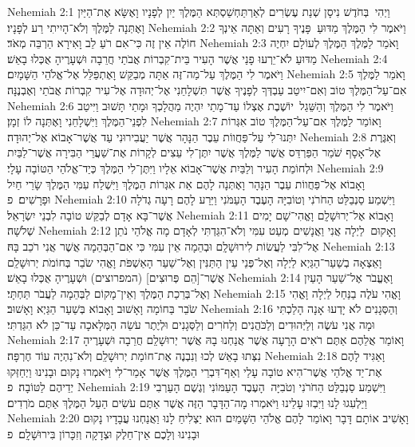 Nehemiah 2:1	וַיְהִי  בְּחֹדֶשׁ נִיסָן שְׁנַת עֶשְׂרִים לְאַרְתַּחְשַׁסְתְּא הַמֶּלֶךְ יַיִן לְפָנָיו וָאֶשָּׂא אֶת־הַיַּיִן וָאֶתְּנָה לַמֶּלֶךְ וְלֹא־הָיִיתִי רַע לְפָנָיו׃
Nehemiah 2:2	וַיֹּאמֶר לִי הַמֶּלֶךְ מַדּוּעַ  פָּנֶיךָ רָעִים וְאַתָּה אֵינְךָ חוֹלֶה אֵין זֶה כִּי־אִם רֹעַ לֵב וָאִירָא הַרְבֵּה מְאֹד׃
Nehemiah 2:3	וָאֹמַר לַמֶּלֶךְ הַמֶּלֶךְ לְעוֹלָם יִחְיֶה מַדּוּעַ לֹא־יֵרְעוּ פָנַי אֲשֶׁר הָעִיר בֵּית־קִבְרוֹת אֲבֹתַי חֲרֵבָה וּשְׁעָרֶיהָ אֻכְּלוּ בָאֵשׁ׃
Nehemiah 2:4	וַיֹּאמֶר לִי הַמֶּלֶךְ עַל־מַה־זֶּה אַתָּה מְבַקֵּשׁ וָאֶתְפַּלֵּל אֶל־אֱלֹהֵי הַשָּׁמָיִם׃
Nehemiah 2:5	וָאֹמַר לַמֶּלֶךְ אִם־עַל־הַמֶּלֶךְ טוֹב וְאִם־יִיטַב עַבְדְּךָ לְפָנֶיךָ אֲשֶׁר תִּשְׁלָחֵנִי אֶל־יְהוּדָה אֶל־עִיר קִבְרוֹת אֲבֹתַי וְאֶבְנֶנָּה׃
Nehemiah 2:6	וַיֹּאמֶר לִי הַמֶּלֶךְ וְהַשֵּׁגַל  יוֹשֶׁבֶת אֶצְלוֹ עַד־מָתַי יִהְיֶה מַהֲלָכְךָ וּמָתַי תָּשׁוּב וַיִּיטַב לִפְנֵי־הַמֶּלֶךְ וַיִּשְׁלָחֵנִי וָאֶתְּנָה לוֹ זְמָן׃
Nehemiah 2:7	וָאוֹמַר לַמֶּלֶךְ אִם־עַל־הַמֶּלֶךְ טוֹב אִגְּרוֹת יִתְּנוּ־לִי עַל־פַּחֲווֹת עֵבֶר הַנָּהָר אֲשֶׁר יַעֲבִירוּנִי עַד אֲשֶׁר־אָבוֹא אֶל־יְהוּדָה׃
Nehemiah 2:8	וְאִגֶּרֶת אֶל־אָסָף שֹׁמֵר הַפַּרְדֵּס אֲשֶׁר לַמֶּלֶךְ אֲשֶׁר יִתֶּן־לִי עֵצִים לְקָרוֹת אֶת־שַׁעֲרֵי הַבִּירָה אֲשֶׁר־לַבַּיִת וּלְחוֹמַת הָעִיר וְלַבַּיִת אֲשֶׁר־אָבוֹא אֵלָיו וַיִּתֶּן־לִי הַמֶּלֶךְ כְּיַד־אֱלֹהַי הַטּוֹבָה עָלָי׃
Nehemiah 2:9	וָאָבוֹא אֶל־פַּחֲווֹת עֵבֶר הַנָּהָר וָאֶתְּנָה לָהֶם אֵת אִגְּרוֹת הַמֶּלֶךְ וַיִּשְׁלַח עִמִּי הַמֶּלֶךְ שָׂרֵי חַיִל וּפָרָשִׁים׃ {פ}
Nehemiah 2:10	וַיִּשְׁמַע סַנְבַלַּט הַחֹרֹנִי וְטוֹבִיָּה הָעֶבֶד הָעַמֹּנִי וַיֵּרַע לָהֶם רָעָה גְדֹלָה אֲשֶׁר־בָּא אָדָם לְבַקֵּשׁ טוֹבָה לִבְנֵי יִשְׂרָאֵל׃
Nehemiah 2:11	וָאָבוֹא אֶל־יְרוּשָׁלָ͏ִם וָאֱהִי־שָׁם יָמִים שְׁלֹשָׁה׃
Nehemiah 2:12	וָאָקוּם  לַיְלָה אֲנִי וַאֲנָשִׁים  מְעַט עִמִּי וְלֹא־הִגַּדְתִּי לְאָדָם מָה אֱלֹהַי נֹתֵן אֶל־לִבִּי לַעֲשׂוֹת לִירוּשָׁלָ͏ִם וּבְהֵמָה אֵין עִמִּי כִּי אִם־הַבְּהֵמָה אֲשֶׁר אֲנִי רֹכֵב בָּהּ׃
Nehemiah 2:13	וָאֵצְאָה בְשַׁעַר־הַגַּיְא לַיְלָה וְאֶל־פְּנֵי עֵין הַתַּנִּין וְאֶל־שַׁעַר הָאַשְׁפֹּת וָאֱהִי שֹׂבֵר בְּחוֹמֹת יְרוּשָׁלַ͏ִם אֲשֶׁר־[הֵם  פְּרוּצִים] (המפרוצים) וּשְׁעָרֶיהָ אֻכְּלוּ בָאֵשׁ׃
Nehemiah 2:14	וָאֶעֱבֹר אֶל־שַׁעַר הָעַיִן וְאֶל־בְּרֵכַת הַמֶּלֶךְ וְאֵין־מָקוֹם לַבְּהֵמָה לַעֲבֹר תַּחְתָּי׃
Nehemiah 2:15	וָאֱהִי עֹלֶה בַנַּחַל לַיְלָה וָאֱהִי שֹׂבֵר בַּחוֹמָה וָאָשׁוּב וָאָבוֹא בְּשַׁעַר הַגַּיְא וָאָשׁוּב׃
Nehemiah 2:16	וְהַסְּגָנִים לֹא יָדְעוּ אָנָה הָלַכְתִּי וּמָה אֲנִי עֹשֶׂה וְלַיְּהוּדִים וְלַכֹּהֲנִים וְלַחֹרִים וְלַסְּגָנִים וּלְיֶתֶר עֹשֵׂה הַמְּלָאכָה עַד־כֵּן לֹא הִגַּדְתִּי׃
Nehemiah 2:17	וָאוֹמַר אֲלֵהֶם אַתֶּם רֹאִים הָרָעָה אֲשֶׁר אֲנַחְנוּ בָהּ אֲשֶׁר יְרוּשָׁלַ͏ִם חֲרֵבָה וּשְׁעָרֶיהָ נִצְּתוּ בָאֵשׁ לְכוּ וְנִבְנֶה אֶת־חוֹמַת יְרוּשָׁלַ͏ִם וְלֹא־נִהְיֶה עוֹד חֶרְפָּה׃
Nehemiah 2:18	וָאַגִּיד לָהֶם אֶת־יַד אֱלֹהַי אֲשֶׁר־הִיא טוֹבָה עָלַי וְאַף־דִּבְרֵי הַמֶּלֶךְ אֲשֶׁר אָמַר־לִי וַיֹּאמְרוּ נָקוּם וּבָנִינוּ וַיְחַזְּקוּ יְדֵיהֶם לַטּוֹבָה׃ {פ}
Nehemiah 2:19	וַיִּשְׁמַע סַנְבַלַּט הַחֹרֹנִי וְטֹבִיָּה  הָעֶבֶד הָעַמּוֹנִי וְגֶשֶׁם הָעַרְבִי וַיַּלְעִגוּ לָנוּ וַיִּבְזוּ עָלֵינוּ וַיֹּאמְרוּ מָה־הַדָּבָר הַזֶּה אֲשֶׁר אַתֶּם עֹשִׂים הַעַל הַמֶּלֶךְ אַתֶּם מֹרְדִים׃
Nehemiah 2:20	וָאָשִׁיב אוֹתָם דָּבָר וָאוֹמַר לָהֶם אֱלֹהֵי הַשָּׁמַיִם הוּא יַצְלִיחַ לָנוּ וַאֲנַחְנוּ עֲבָדָיו נָקוּם וּבָנִינוּ וְלָכֶם אֵין־חֵלֶק וּצְדָקָה וְזִכָּרוֹן בִּירוּשָׁלָ͏ִם׃ {פ}
